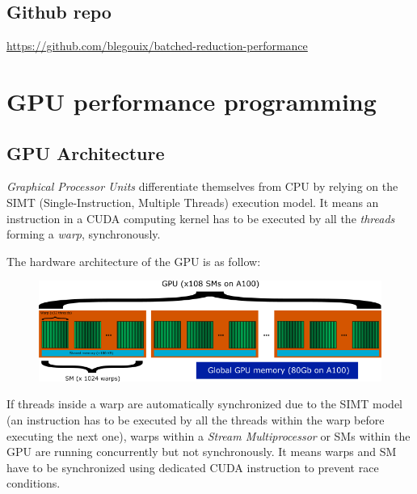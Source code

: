 \documentclass{article}
\begin{document}
\tableofcontents

\vspace{30pt}

\subsection*{Github repo}

\href{https://github.com/blegouix/batched-reduction-performance}{https://github.com/blegouix/batched-reduction-performance}

\newpage

\setcounter{page}{1}
\fancyfoot[R]{\thepage}

\section{GPU performance programming}


\subsection{GPU Architecture}

\textit{Graphical Processor Units} differentiate themselves from CPU by relying on the SIMT (Single-Instruction, Multiple Threads) execution model. It means an instruction in a CUDA computing kernel has to be executed by all the \textit{threads} forming a \textit{warp}, synchronously.

The hardware architecture of the GPU is as follow:

\begin{figure}[H]
\begin{center}
\includegraphics[width=\textwidth]{assets/gpu_arch.png}
\end{center}
\label{fig:gpu_arch}
\end{figure}

If threads inside a warp are automatically synchronized due to the SIMT model (an instruction has to be executed by all the threads within the warp before executing the next one), warps within a \textit{Stream Multiprocessor} or SMs within the GPU are running concurrently but not synchronously. It means warps and SM have to be synchronized using dedicated CUDA instruction to prevent race conditions.
\end{document}
